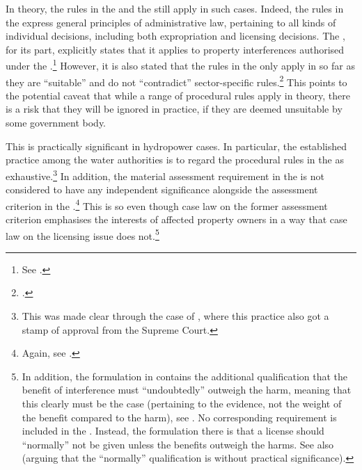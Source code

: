 In theory, the rules in the \cite{ea59} and the \cite{paa67} still apply in such cases. Indeed, the rules in the \cite{paa67} express general principles of administrative law, pertaining to all kinds of individual decisions, including both expropriation and  licensing decisions. The \cite{ea59}, for its part, explicitly states that it applies to property interferences authorised under the \cite{wra17}.\footnote{See \cite[30]{ea59}.} However, it is also stated that the rules in the \cite{ea59} only apply in so far as they are ``suitable'' and do not ``contradict'' sector-specific rules.\footcite[30]{ea59} This points to the potential caveat that while a range of procedural rules apply in theory, there is a risk that they will be ignored in practice, if they are deemed unsuitable by some government body.

This is practically significant in hydropower cases. In particular, the established practice among the water authorities is to regard the procedural rules in the \cite{wra17} as exhaustive.\footnote{This was made clear through the case of \cite{jorpeland11}, where this practice also got a stamp of approval from the Supreme Court.} In addition, the material assessment requirement in the \cite{ea59} is not considered to have any independent significance alongside the assessment criterion in the \cite{wra17}.\footnote{Again, see \cite{jorpeland11}.} This is so even though case law on the former assessment criterion emphasises the interests of affected property owners in a way that case law on the licensing issue does not.\footnote{In addition, the formulation in \cite[2]{ea59} contains the additional qualification that the benefit of interference must ``undoubtedly'' outweigh the harm, meaning that this clearly must be the case (pertaining to the evidence, not the weight of the benefit compared to the harm), see \cite{lovenskiold09}. No corresponding requirement is included in the \cite[8]{wra17}. Instead, the formulation there is that a license should ``normally'' not be given unless the benefits outweigh the harms. See also \cite[325-236]{haagensen02} (arguing that the ``normally'' qualification is without practical significance).}


